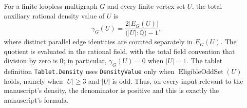 \begin{definition}
For a finite loopless multigraph $G$ and every finite vertex set $U$, the
total auxiliary rational density value of $U$ is
\[
  \gamma_G(U)=\frac{2|E_G(U)|}{\bigl(|U|:\mathbb{Q}\bigr)-1},
\]
where distinct parallel edge identities are counted separately in
$E_G(U)$.  The quotient is evaluated in the rational field, with the total
field convention that division by zero is $0$; in particular,
$\gamma_G(U)=0$ when $|U|=1$.  The tablet definition
\texttt{Tablet.Density} uses \texttt{DensityValue} only when
$\operatorname{EligibleOddSet}(U)$ holds, namely when $|U|\ge 3$ and $|U|$
is odd.
Thus, on every input relevant to the manuscript's density, the denominator
is positive and this is exactly the manuscript's formula.
\end{definition}
